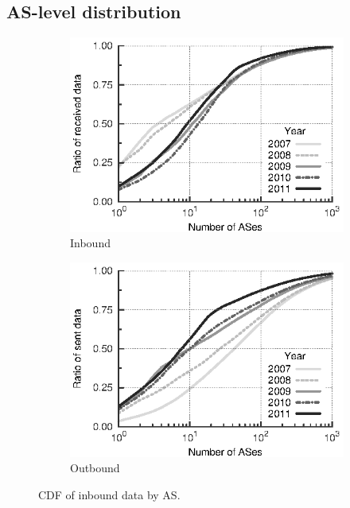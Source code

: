 \subsection{\acs{AS}-level distribution}
\begin{figure}
    \centering
    \begin{subfigure}[b]{0.5\linewidth}
        \includegraphics{figures/malawi/asn_cdf_in}
        \caption{Inbound}
    \end{subfigure}%
    \begin{subfigure}[b]{0.5\linewidth}
        \includegraphics{figures/malawi/asn_cdf_out}
        \caption{Outbound}
    \end{subfigure}%
    \caption{CDF of inbound data by AS. \label{fig:ecdf_asn_from}}
\end{figure}


